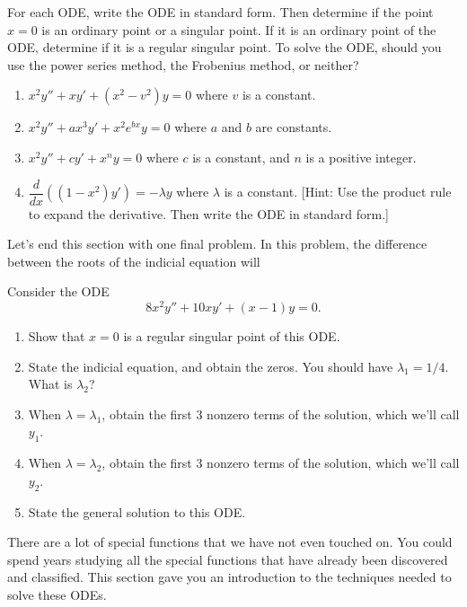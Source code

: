 \begin{problem}
 For each ODE, write the ODE in standard form.  Then determine if the point $x=0$ is an ordinary point or a singular point.  If it is an ordinary point of the ODE, determine if it is a regular singular point. To solve the ODE, should you use the power series method, the Frobenius method, or neither?
\begin{enumerate}
 \item $x^2y''+xy'+(x^2-v^2)y=0$ where $v$ is a constant.
 \item $x^2y''+ax^3y'+x^2e^{bx}y=0$ where $a$ and $b$ are constants.
 \item $x^2y''+cy'+x^ny=0$ where $c$ is a constant, and $n$ is a positive integer. 
 \item $\dfrac{d}{dx}\left((1-x^2)y'\right)=-\lambda y$ where $\lambda$ is a constant. [Hint: Use the product rule to expand the derivative. Then write the ODE in standard form.]
\end{enumerate}
\end{problem}

Let's end this section with one final problem. In this problem, the difference between the roots of the indicial equation will
\begin{problem}
 Consider the ODE $$8x^2y''+10xy'+(x-1)y=0.$$
\begin{enumerate}
 \item Show that $x=0$ is a regular singular point of this ODE.
 \item State the indicial equation, and obtain the zeros.  You should have $\lambda_1=1/4$.  What is $\lambda_2$?
 \item  {}%
When $\lambda=\lambda_1$, obtain the first 3 nonzero terms of the solution, which we'll call $y_1$. 
 \item When $\lambda=\lambda_2$, obtain the first 3 nonzero terms of the solution, which we'll call $y_2$. 
 \item State the general solution to this ODE. 
\end{enumerate}

\end{problem}
 
There are a lot of special functions that we have not even touched on.  You could spend years studying all the special functions that have already been discovered and classified.  This section gave you an introduction to the techniques needed to solve these ODEs.

